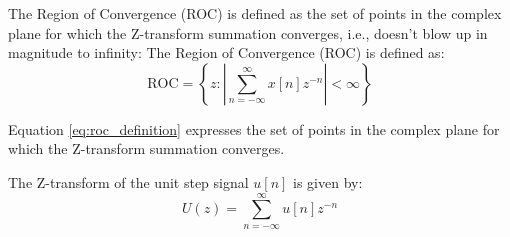 \documentclass[journal,12pt,twocolumn]{IEEEtran}
\theoremstyle{remark}
\begin{document}
\begin{enumerate}[label=\alph*)]
The Region of Convergence (ROC) is defined as the set of points in the complex plane for which the Z-transform summation converges, i.e., doesn't blow up in magnitude to infinity:
The Region of Convergence (ROC) is defined as:
\begin{equation}\label{eq:roc_definition}
    \text{ROC} = \left\{ z : \left| \sum_{n=-\infty}^{\infty} x[n]z^{-n} \right| < \infty \right\}
\end{equation}

Equation \eqref{eq:roc_definition} expresses the set of points in the complex plane for which the Z-transform summation converges.

The Z-transform of the unit step signal \(u[n]\) is given by:
\begin{equation}\label{eq:z_transform}
    U(z) = \sum_{n=-\infty}^{\infty} u[n] z^{-n}
\end{equation}


\end{enumerate}
\end{document}
